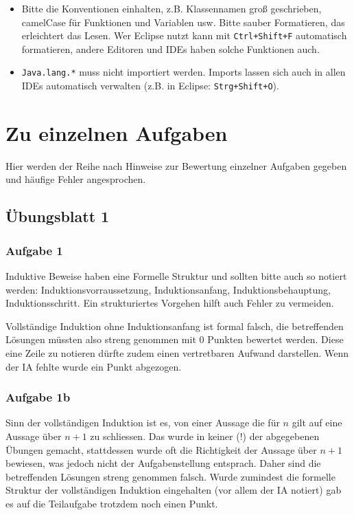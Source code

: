 \documentclass[%
	final, %
	normalheadings, %
	ngerman, %
	a4paper,
	1.1headlines, %
	pagesize, %
	halfparskip, %
	pointlessnumbers, %
	fleqn, %
]{scrartcl} %
\begin{document}
\begin{itemize}
    \item Bitte die Konventionen einhalten, z.B. Klassennamen groß geschrieben,
          camelCase für Funktionen und Variablen usw. Bitte sauber Formatieren,
          das erleichtert das Lesen. Wer Eclipse nutzt kann mit
          \texttt{Ctrl+Shift+F} automatisch formatieren, andere Editoren und
          IDEs haben solche Funktionen auch.
    \item \texttt{Java.lang.*} muss nicht importiert werden. Imports lassen
          sich auch in allen IDEs automatisch verwalten (z.B. in Eclipse:
          \texttt{Strg+Shift+O}).
\end{itemize}


\section{Zu einzelnen Aufgaben}

Hier werden der Reihe nach Hinweise zur Bewertung einzelner Aufgaben gegeben und
häufige Fehler angesprochen.

\subsection{Übungsblatt 1}

\subsubsection{Aufgabe 1}

Induktive Beweise haben eine Formelle Struktur und sollten bitte auch so notiert
werden: Induktionsvorraussetzung, Induktionsanfang, Induktionsbehauptung,
Induktionsschritt. Ein strukturiertes Vorgehen hilft auch Fehler zu vermeiden.

Vollständige Induktion ohne Induktionsanfang ist formal falsch, die betreffenden
Lösungen müssten also streng genommen mit 0 Punkten bewertet werden. Diese eine
Zeile zu notieren dürfte zudem einen vertretbaren Aufwand darstellen. Wenn der
IA fehlte wurde ein Punkt abgezogen.

\subsubsection{Aufgabe 1b}

Sinn der vollständigen Induktion ist es, von einer Aussage die für $n$ gilt
auf eine Aussage über $n+1$ zu schliessen. Das wurde in keiner (!) der
abgegebenen Übungen gemacht, stattdessen wurde oft die Richtigkeit der
Aussage über $n+1$ bewiesen, was jedoch nicht der Aufgabenstellung entsprach.
Daher sind die betreffenden Lösungen streng genommen falsch. Wurde zumindest 
die formelle Struktur der vollständigen Induktion eingehalten (vor allem der
IA notiert) gab es auf die Teilaufgabe trotzdem noch einen Punkt.
\end{document}

